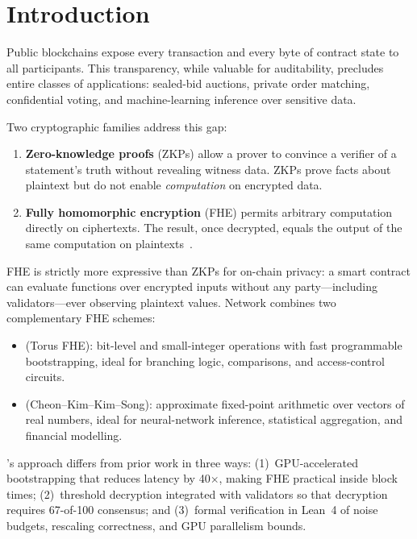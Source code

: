 \section{Introduction}

\label{sec:intro}

Public blockchains expose every transaction and every byte of contract state to all participants. This transparency, while valuable for auditability, precludes entire classes of applications: sealed-bid auctions, private order matching, confidential voting, and machine-learning inference over sensitive data.

Two cryptographic families address this gap:

\begin{enumerate}
  \item \textbf{Zero-knowledge proofs} (ZKPs) allow a prover to convince a verifier of a statement's truth without revealing witness data. ZKPs prove facts about plaintext but do not enable \emph{computation} on encrypted data.
  \item \textbf{Fully homomorphic encryption} (FHE) permits arbitrary computation directly on ciphertexts. The result, once decrypted, equals the output of the same computation on plaintexts~\cite{gentry2009fhe}.
\end{enumerate}

FHE is strictly more expressive than ZKPs for on-chain privacy: a smart contract can evaluate functions over encrypted inputs without any party---including validators---ever observing plaintext values. \Zoo{} Network combines two complementary FHE schemes:

\begin{itemize}
  \item \textbf{\TFHE{}} (Torus FHE): bit-level and small-integer operations with fast programmable bootstrapping, ideal for branching logic, comparisons, and access-control circuits.
  \item \textbf{\CKKS{}} (Cheon--Kim--Kim--Song): approximate fixed-point arithmetic over vectors of real numbers, ideal for neural-network inference, statistical aggregation, and financial modelling.
\end{itemize}

\Zoo{}'s approach differs from prior work in three ways: (1)~GPU-accelerated bootstrapping that reduces latency by 40$\times$, making FHE practical inside block times; (2)~threshold decryption integrated with \Zoo{} \TChain{} validators so that decryption requires 67-of-100 consensus; and (3)~formal verification in Lean~4 of noise budgets, rescaling correctness, and GPU parallelism bounds.

